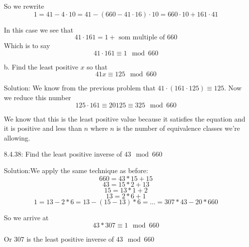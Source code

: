 \documentclass[16 pt]{amsart}
\theoremstyle{definition}
\theoremstyle{remark}
\numberwithin{equation}{subsection}
\begin{document}
So we rewrite 
\[
1 = 41 - 4\cdot 10 = 41 - (660-41\cdot 16)\cdot 10 = 660 \cdot 10 + 161\cdot 41
\]

In this case we see that 
\[
41\cdot 161 = 1  + \text{ som multiple of } 660
\]
Which is to say
\[
41\cdot 161 \equiv 1 \mod{660}
\]

\vspace{.5in}

b. Find the least positive $x$ so that
\[
41x \equiv 125 \mod{660}
\]

\vspace{.5in}

Solution: We know from the previous problem that $41\cdot (161\cdot 125) \equiv 125$. Now we reduce this number
\[
125\cdot 161 \equiv 20125 \equiv 325 \mod{660}
\]

We know that this is the least positive value because it satisfies the equation and it is positive and less than $n$ where $n$ is the number of equivalence classes we're allowing.

\newpage


8.4.38:  Find the least positive inverse of $43 \mod{660}$

\vspace{1in}

Solution:We apply the same technique as before:
\[
660 = 43* 15 + 15
\]
\[
43 = 15 * 2 + 13 
\]
\[
15 = 13 * 1 + 2
\]
\[
13 = 2* 6 + 1
\]
\[
1 = 13- 2*6 = 13 - (15-13)* 6 = ... = 307*43 - 20*660
\]

So we arrive at
\[
43*307\equiv 1\mod{660}
\]

Or $307$ is the least positive inverse of $43\mod{660}$
\end{document}
